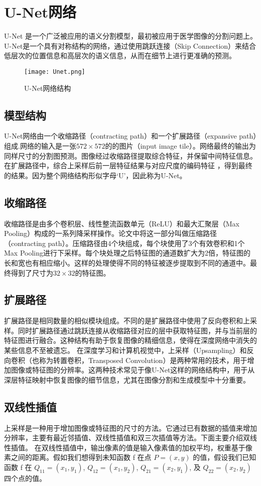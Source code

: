 \section{U-Net网络}
U-Net
\cite{cheng2021transfer}是一个广泛被应用的语义分割模型，最初被应用于医学图像的分割问题上。U-Net是一个具有对称结构的网络，通过使用跳跃连接（Skip Connection）来结合低层次的位置信息和高层次的语义信息，从而在细节上进行更准确的预测。
\begin{figure}[h]
  \centering
  \texttt{[image: Unet.png]}
  \caption{U-Net网络结构}
  \label{fig:UNet}
\end{figure}
\subsection{模型结构}
U-Net网络由一个收缩路径（contracting path）和一个扩展路径（expansive path）组成.网络的输入是一张$572\times 572$的的图片（input image tile）。网络最终的输出为同样尺寸的分割图预测。图像经过收缩路径提取综合特征，并保留中间特征信息。在扩展路径中，综合上采样后前一层特征结果与对应尺度的编码特征 ，得到最终的结果。因为整个网络结构形似字母‘U’，因此称为U-Net。
\subsection{收缩路径}
收缩路径是由多个卷积层、线性整流函数单元（ReLU）和最大汇聚层（Max Pooling）构成的一系列降采样操作。论文中将这一部分叫做压缩路径（contracting path）。压缩路径由4个块组成，每个块使用了3个有效卷积和1个Max Pooling进行下采样。每个块处理之后特征图的通道数扩大为2倍，特征图的长和宽也有相应缩小。这样的处理使得不同的特征被逐步提取到不同的通道中。最终得到了尺寸为$32\times 32$的特征图。
\subsection{扩展路径}
扩展路径是相同数量的相似模块组成。不同的是扩展路径中使用了反向卷积和上采样。同时扩展路径通过跳跃连接从收缩路径对应的层中获取特征图，并与当前层的特征图进行融合。这种结构有助于恢复图像的精细信息，使得在深度网络中消失的某些信息不至被遗忘。
在深度学习和计算机视觉中，上采样（Upsampling）和反向卷积（也称为转置卷积，Transposed Convolution）是两种常用的技术，用于增加图像或特征图的分辨率。这两种技术常见于像U-Net这样的网络结构中，用于从深层特征映射中恢复图像的细节信息，尤其在图像分割和生成模型中十分重要。

\subsection{双线性插值}
上采样是一种用于增加图像或特征图的尺寸的方法。它通过已有数据的插值来增加分辨率，主要有最近邻插值、双线性插值和双三次插值等方法。下面主要介绍双线性插值\cite{2022Upsamplingcomparativestudynewideas}。
在双线性插值中，输出像素的值是输入像素值的加权平均，权重基于像素之间的距离。假如我们想得到未知函数 f 在点 $P=\left( x, y\right)$ 的值，假设我们已知函数 f 在 $Q_{11} = \left( x_1, y_1 \right) $, $Q_{12} = \left( x_1, y_2 \right) $, $Q_{21} = \left( x_2, y_1 \right) $, 及 $Q_{22} = \left( x_2, y_2 \right) $ 四个点的值。 

